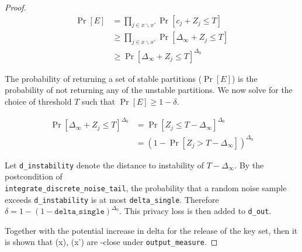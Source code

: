 \documentclass{article}
\begin{document}
\begin{proof}
\begin{align*}
    \Pr[E] &= \prod_{j \in x \backslash x'} \Pr[c_j + Z_j \le T] \\
    &\ge \prod_{j \in x \backslash x'} \Pr[\Delta_\infty + Z_j \le T] \\
    &\ge \Pr[\Delta_\infty + Z_j \le T]^{\Delta_0}
\end{align*}

The probability of returning a set of stable partitions ($\Pr[E]$) 
is the probability of not returning any of the unstable partitions.
We now solve for the choice of threshold $T$ such that $\Pr[E] \ge 1 - \delta$.

\begin{align*}
    \Pr[\Delta_\infty + Z_j \le T]^{\Delta_0} &= \Pr[Z_j \le T - \Delta_\infty]^{\Delta_0} \\
    &= (1 - \Pr[Z_j > T - \Delta_\infty])^{\Delta_0}
\end{align*}

Let \texttt{d\_instability} denote the distance to instability of $T - \Delta_\infty$.
By the postcondition of \\ \texttt{integrate\_discrete\_noise\_tail},
the probability that a random noise sample exceeds \texttt{d\_instability} is at most \texttt{delta\_single}.
Therefore $\delta = 1 - (1 - \texttt{delta\_single})^{\Delta_0}$.
This privacy loss is then added to \texttt{d\_out}.

Together with the potential increase in delta for the release of the key set,
then it is shown that \function(x), \function(x') are \dout-close under \texttt{output\_measure}.

\end{proof}



\end{document}
